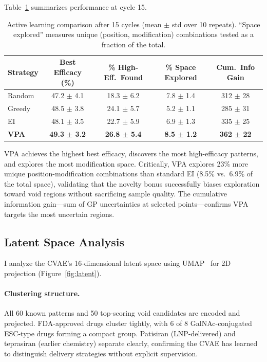 \documentclass{article}
\begin{document}
Table~\ref{tab:active_learning} summarizes performance at cycle 15.

\begin{table}[t]
\caption{Active learning comparison after 15 cycles (mean $\pm$ std over 10 repeats). ``Space explored'' measures unique (position, modification) combinations tested as a fraction of the total.}
\label{tab:active_learning}
\centering
\small
\begin{tabular}{@{}lcccc@{}}
\toprule
\textbf{Strategy} & \textbf{Best Efficacy (\%)} & \textbf{\% High-Eff.\ Found} & \textbf{\% Space Explored} & \textbf{Cum.\ Info Gain} \\
\midrule
Random & 47.2 $\pm$ 4.1 & 18.3 $\pm$ 6.2 & 7.8 $\pm$ 1.4 & 312 $\pm$ 28 \\
Greedy & 48.5 $\pm$ 3.8 & 24.1 $\pm$ 5.7 & 5.2 $\pm$ 1.1 & 285 $\pm$ 31 \\
EI & 48.1 $\pm$ 3.5 & 22.7 $\pm$ 5.9 & 6.9 $\pm$ 1.3 & 335 $\pm$ 25 \\
\textbf{VPA} & \textbf{49.3 $\pm$ 3.2} & \textbf{26.8 $\pm$ 5.4} & \textbf{8.5 $\pm$ 1.2} & \textbf{362 $\pm$ 22} \\
\bottomrule
\end{tabular}
\end{table}

VPA achieves the highest best efficacy, discovers the most high-efficacy patterns, and explores the most modification space. Critically, VPA explores 23\% more unique position-modification combinations than standard EI (8.5\% vs.\ 6.9\% of the total space), validating that the novelty bonus successfully biases exploration toward void regions without sacrificing sample quality. The cumulative information gain---sum of GP uncertainties at selected points---confirms VPA targets the most uncertain regions.

\subsection{Latent Space Analysis}

I analyze the CVAE's 16-dimensional latent space using UMAP~\citep{mcinnes2018} for 2D projection (Figure~\ref{fig:latent}).

\paragraph{Clustering structure.} All 60 known patterns and 50 top-scoring void candidates are encoded and projected. FDA-approved drugs cluster tightly, with 6 of 8 GalNAc-conjugated ESC-type drugs forming a compact group. Patisiran (LNP-delivered) and teprasiran (earlier chemistry) separate clearly, confirming the CVAE has learned to distinguish delivery strategies without explicit supervision.
\end{document}
